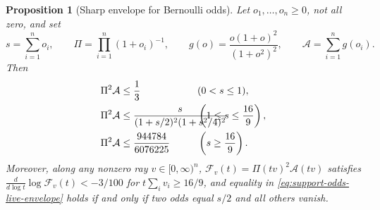\documentclass[11pt]{article}
\numberwithin{equation}{section}
\newtheorem{proposition}[theorem]{Proposition}
\theoremstyle{definition}
\theoremstyle{remark}
\begin{document}
\begin{samepage}
\begin{proposition}[Sharp envelope for Bernoulli odds]
\label{prop:product-normalized-odds-envelope}
Let $o_1,\ldots,o_n\geq0$, not all zero, and set
\begin{equation}
 s=\sum_{i=1}^n o_i,\qquad
 \Pi=\prod_{i=1}^n(1+o_i)^{-1},\qquad
 g(o)=\frac{o(1+o)^2}{(1+o^2)^2},\qquad
 \mathcal A=\sum_{i=1}^n g(o_i).
\label{eq:support-odds-data}
\end{equation}
Then
\begin{align}
 \Pi^2\mathcal A&\leq\frac13&&\hspace{-4em}(0<s\leq1),
\label{eq:support-odds-small-envelope}\\
 \Pi^2\mathcal A&\leq
 \frac{s}{(1+s/2)^2(1+s^2/4)^2}&&\hspace{-4em}\left(1\leq s\leq\frac{16}{9}\right),
\label{eq:support-odds-live-envelope}\\
 \Pi^2\mathcal A&\leq\frac{944784}{6076225}&&\hspace{-4em}\left(s\geq\frac{16}{9}\right).
\label{eq:support-odds-large-envelope}
\end{align}
Moreover, along any nonzero ray $v\in[0,\infty)^n$, $\mathcal F_v(t)=\Pi(tv)^2\mathcal A(tv)$
satisfies $\frac{d}{d\log t}\log\mathcal F_v(t)<-3/100$ for $t\sum_iv_i\ge16/9$,
and equality in \eqref{eq:support-odds-live-envelope} holds if and only if
two odds equal $s/2$ and all others vanish.
\end{proposition}
\end{samepage}
\end{document}
